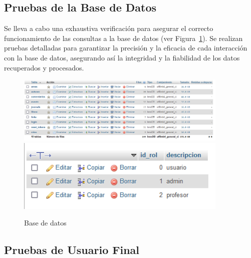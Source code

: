 \documentclass[a4paper, 12pt]{book}
\begin{document}
\subsection{Pruebas de la Base de Datos}
\label{sec:base_datos}
Se lleva a cabo una exhaustiva verificación para asegurar el correcto funcionamiento de las consultas a la base de datos 
(ver Figura~\ref{fig:db}). Se realizan pruebas detalladas para garantizar la precisión y la eficacia de cada interacción 
con la base de datos, asegurando así la integridad y la fiabilidad de los datos recuperados y procesados.

\begin{figure}
  \centering
  \includegraphics[width=0.9\textwidth]{img/db.png}
  \includegraphics[width=0.9\textwidth]{img/roldb.png}
  \caption{Base de datos}
  \label{fig:db}
\end{figure}



\subsection{Pruebas de Usuario Final}
\label{sec:usuario_final}
\end{document}
